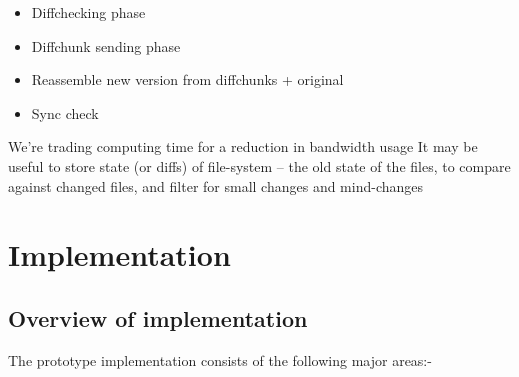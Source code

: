 \documentclass[12pt,a4paper,]{adreport}
\begin{document}
\begin{itemize}
\itemsep1pt\parskip0pt
\item
  Diffchecking phase
\item
  Diffchunk sending phase
\item
  Reassemble new version from diffchunks + original
\item
  Sync check
\end{itemize}

We're trading computing time for a reduction in bandwidth usage It may
be useful to store state (or diffs) of file-system -- the old state of
the files, to compare against changed files, and filter for small
changes and mind-changes

\chapter{Implementation}\label{implementation}

\section{Overview of implementation}\label{overview-of-implementation}

The prototype implementation consists of the following major areas:-
\end{document}
